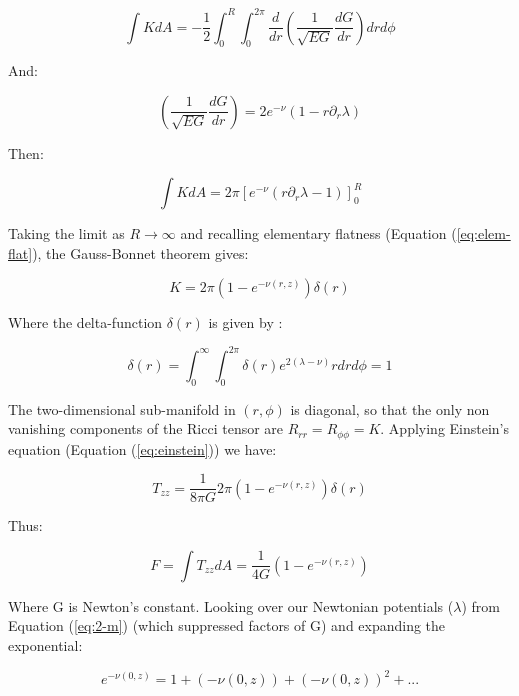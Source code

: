 \documentclass{article}
\begin{document}
\begin{equation}
\int KdA=-\frac{1}{2}\int^{R}_{0}\int^{2\pi}_{0}\frac{d}{dr}\left(\frac{1}{\sqrt{EG}}\frac{dG}{dr}\right)drd\phi
\end{equation}

And:

\begin{equation}
\left(\frac{1}{\sqrt{EG}}\frac{dG}{dr}\right)=2e^{-\nu}\left(1-r\partial_{r}\lambda\right)
\end{equation}

Then:

\begin{equation}
\int KdA=2\pi[e^{-\nu}\left(r\partial_{r}\lambda-1\right)]^{R}_{0}
\end{equation}

Taking the limit as $R\rightarrow\infty$ and recalling elementary flatness (Equation (\ref{eq:elem-flat}), the Gauss-Bonnet theorem gives:

\begin{equation}
K=2\pi\left(1-e^{-\nu (r,z)}\right)\delta(r)
\end{equation}

Where the delta-function $\delta(r)$ is given by \cite{araujo_static_1995}:

\begin{equation}
\delta(r)=\int^{\infty}_{0} \int^{2\pi}_{0} \delta (r)e^{2\left(\lambda-\nu\right)}rdrd\phi =1
\end{equation} 

The two-dimensional sub-manifold in $\left(r,\phi\right)$ is diagonal, so that the only non vanishing components of the Ricci tensor are $R_{rr}=R_{\phi\phi}=K$. Applying Einstein's equation (Equation (\ref{eq:einstein})) we have:

\begin{equation}
T_{zz}=\frac{1}{8\pi G}2\pi\left(1-e^{-\nu (r,z)}\right)\delta(r)
\end{equation} 

Thus:

\begin{equation}
F=\int T_{zz}dA=\frac{1}{4G}\left(1-e^{-\nu (r,z)}\right)
\end{equation}

Where G is Newton's constant. Looking over our Newtonian potentials ($\lambda$) from Equation (\ref{eq:2-m}) (which suppressed factors of G) and expanding the exponential:

\begin{equation}
e^{-\nu\left(0,z\right)}=1+\left(-\nu\left(0,z\right)\right)+\left(-\nu\left(0,z\right)\right)^{2}+...
\end{equation}
\end{document}
